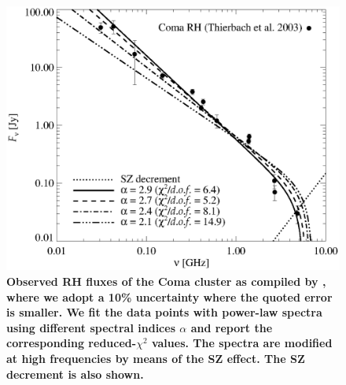 \documentclass[useAMS,usenatbib]{mn2e}
\begin{document}
\begin{figure} 
\centering
\includegraphics[width=\columnwidth]{figures/SZ_Coma.eps}
\caption{{\bf Observed RH fluxes of the Coma cluster as compiled
by \citet{2003A&A...397...53T}, where we adopt a 10\% uncertainty
where the quoted error is smaller. We fit the data points with power-law 
spectra using different spectral indices $\alpha$ and report the corresponding
reduced-$\chi^{2}$ values. The spectra are modified at high frequencies by 
means of the SZ effect. The SZ decrement is also shown.}}
\label{fig:SZ_Coma}
\end{figure}
\end{document}

